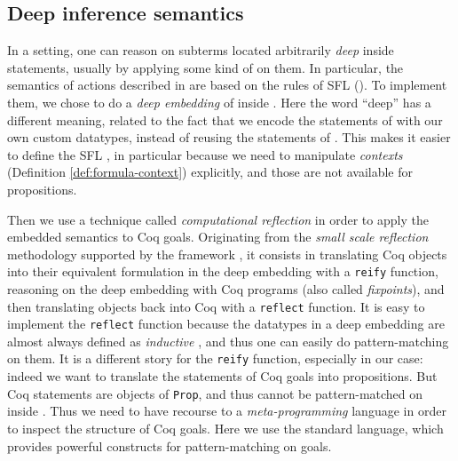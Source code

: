 \subsection{Deep inference semantics}

In a  setting, one can reason on subterms located arbitrarily
\emph{deep} inside statements, usually by applying some kind of  on them. In particular, the semantics of  actions described in
 are based on the rules of SFL (). To implement them, we
chose to do a \emph{deep embedding} of  inside .
Here the word ``deep'' has a different meaning, related to the fact that we
encode the statements of  with our own custom datatypes,
instead of reusing the statements of . This makes it easier to define
the SFL , in particular because we need to manipulate
\emph{contexts} (Definition \ref{def:formula-context}) explicitly, and those are
not available for  propositions.

Then we use a technique called \emph{computational reflection} in order to apply
the embedded  semantics to Coq goals. Originating from the
\emph{small scale reflection} methodology supported by the {\ssreflect}
framework \cite{SSR}, it consists in translating Coq objects into their
equivalent formulation in the deep embedding with a \texttt{reify} function,
reasoning on the deep embedding with Coq programs (also called
\emph{fixpoints}), and then translating objects back into Coq with a
\texttt{reflect} function. It is easy to implement the \texttt{reflect} function
because the datatypes in a deep embedding are almost always defined as
\emph{inductive} , and thus one can easily do pattern-matching on them. It
is a different story for the \texttt{reify} function, especially in our case:
indeed we want to translate the statements of Coq goals into 
propositions. But Coq statements are objects of  \texttt{Prop}, and thus
cannot be pattern-matched on inside .
Thus we need to have recourse to a \emph{meta-programming} language in order to
inspect the structure of Coq goals. Here we use the standard {\ltac} language,
which provides powerful constructs for pattern-matching on goals.

